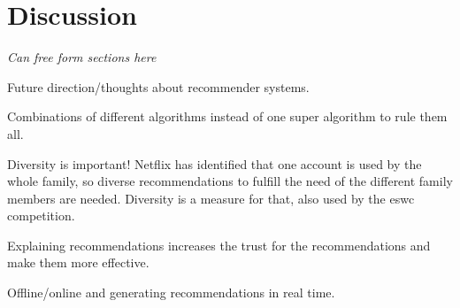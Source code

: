 \chapter{Discussion}\label{cha:discussion}

\textit{Can free form sections here}




Future direction/thoughts about recommender systems.

Combinations of different algorithms instead of one super algorithm to rule them all.

Diversity is important! Netflix has identified that one account is used by the whole family, so diverse recommendations to fulfill the need of the different family members are needed. Diversity is a measure for that, also used by the eswc competition.

Explaining recommendations increases the trust for the recommendations and make them more effective.

Offline/online and generating recommendations in real time.

